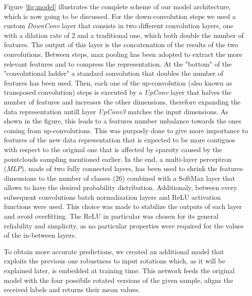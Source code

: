 Figure \ref{fig:model} illustrates the complete scheme of our model architecture, which is now going to be discussed.
For the down-convolution steps we used a custom \textit{DownConv} layer that consists in two different
convolution layers, one with a dilation rate of 2 and a traditional one, which both double the number of features. 
The output of this layer is the concatenation of the results of the two convolutions.
Between steps, max pooling has been adopted to extract the more relevant features and to compress the representation.
At the "bottom" of the "convolutional ladder" a standard convolution that doubles the number of features has been used.
Then, each one of the up-convolution (also known as transposed convolution) steps is executed by a \textit{UpConv} layer that halves the number of features
and increases the other dimensions, therefore expanding the data representation untill layer \textit{UpConv3} matches the input dimensions.
As shown in the figure, this leads to a features number unbalance towards the ones coming from up-convolutions.
This was purposly done to give more importance to features of the new data representation that is expected to be more 
contiguos with respect to the original one that is affected by sparsity caused by the pointclouds sampling mentioned earlier.
In the end, a multi-layer perceptron (\textit{MLP}), made of two fully connected layers, has been used
to shrink the features dimensions to the number of classes (26) combined with a SoftMax layer that allows
to have the desired probability distribution.
Additionaly, between every subsequent convolutions batch normalization layers and ReLU activation functions were used.
This choice was made to stabilize the outputs of each layer and avoid overfitting. The ReLU in particular was chosen for
its general reliability and simplicity, as no particular properties were required
for the values of the in-between layers.

To obtain more accurate predictions, we created an additional model that exploits the previous
one robustness to input rotations which, as it will be explained later, is embedded at training time.
This network feeds the original model with the four possibile rotated versions of the given sample, 
aligns the received labels and returns their mean values.
